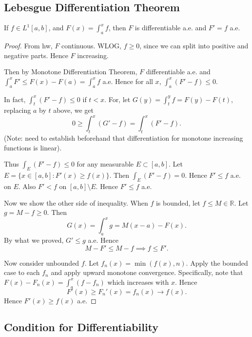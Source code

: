 
\subsection{Lebesgue Differentiation Theorem}

\begin{theorem}
	If $f \in L^1[a,b]$, and  $F(x) = \int _a^x f$, then  $F$ is differentiable a.e. and $F' = f$ a.e.
\end{theorem}
\begin{proof}
	From hw, $F$ continuous. WLOG, $f \ge 0$, since we can split into positive and negative parts. Hence $F$ increasing.

	Then by Monotone Differentiation Theorem, $F$ differentiable a.e. and $\int _a^x F' \le F(x) - F(a) = \int _a^x f$ a.e. Hence for all $x$, $\int _a^x (F' - f) \le 0$.

	In fact, $\int _t^x (F' - f) \le 0$ if $t < x$. For, let $G(y) = \int _t^y f = F(y) - F(t)$, replacing $a$ by $t$ above, we get
	\[
		0 \ge \int _t^x \left( G' - f \right) =  \int _t^x (F' - f)
	.\] 
	(Note: need to establish beforehand that differentiation for monotone increasing functions is linear).

	Thus $\int _E (F' - f) \le 0$ for any measurable  $E \subset [a,b]$. Let $E = \{x \in [a,b]: F'(x) \ge f(x)\} $. Then $\int _E (F' - f) = 0$. Hence $F' \le f$ a.e. on $E$. Also $F' < f$ on $[a,b] \setminus E$. Hence $F' \le f$ a.e.

	Now we show the other side of inequality. When $f$ is bounded, let $f \le M \in \mathbb{R}$. Let $g = M - f  \ge 0$. Then
	\[
		G(x) = \int _a^x g = M(x-a) - F(x)
	.\] 
	By what we proved, $G' \le g$ a.e. Hence
	\[
		M - F' \le  M - f \implies f \le  F' 
	.\] 

	Now consider unbounded $f$. Let $f_n(x) = \min\left( f(x), n \right) $. Apply the bounded case to each $f_n$ and apply upward monotone convergence. Specifically, note that $F(x) - F_n(x) = \int_a^x (f - f_n)$ which increases with  $x$. Hence
	\[
		F'(x) \ge F_n'(x) = f_n(x) \to f(x)
	.\] 
	Hence $F'(x) \ge f(x)$ a.e.
\end{proof}


\subsection{Condition for Differentiability}

